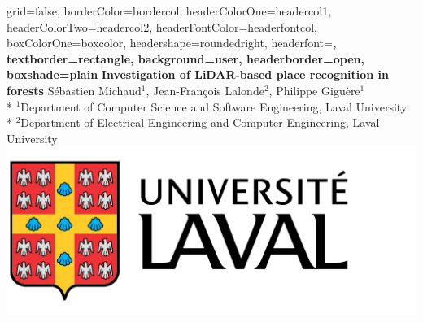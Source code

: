 \documentclass[a0paper,portrait]{baposter}
\begin{document}
\begin{poster}{
        grid=false,
        borderColor=bordercol, %
        headerColorOne=headercol1, %
        headerColorTwo=headercol2, %
        headerFontColor=headerfontcol, %
        boxColorOne=boxcolor, %
        headershape=roundedright, %
        headerfont=\Large\sf\bf, %
        textborder=rectangle,
        background=user,
        headerborder=open, %
        boxshade=plain
    }
    {}
    {\sf\bf Investigation of LiDAR-based place recognition in forests}
    {\vspace{0.2em} Sébastien Michaud$^1$, Jean-François Lalonde$^2$, Philippe Giguère$^1$\\* %
        {\vspace{-0.4em}\small $^1$Department of Computer Science and Software Engineering, Laval University}\\*
        {\vspace{-0.2em}\small $^2$Department of Electrical Engineering and Computer Engineering, Laval University}}
    {\includegraphics[scale=0.12]{./figures/logo.png}} %

\end{poster}
\end{document}
